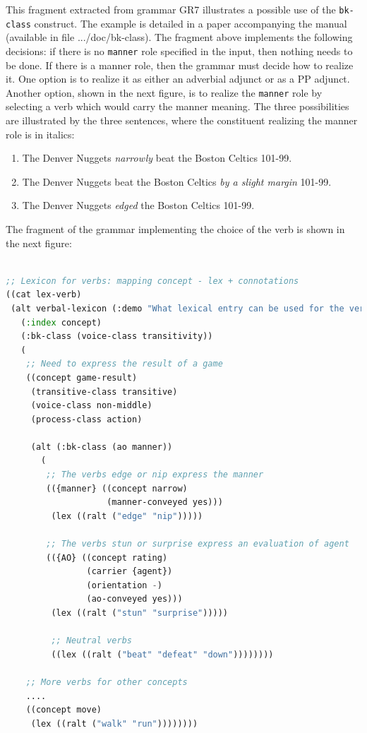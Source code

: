 \documentclass[10pt,a4paper]{report}
\begin{document}
This fragment extracted from grammar GR7  illustrates a
possible use of the {\tt bk-class} construct.  The example is detailed in a
paper accompanying the manual (available in file .../doc/bk-class).  The
fragment above implements the following decisions: if there is no
{\tt manner} role specified in the input, then nothing needs to be done.  If
there is a manner role, then the grammar must decide how to realize it.
One option is to realize it as either an adverbial adjunct or as a PP
adjunct.  Another option, shown in the next figure, is to realize the
{\tt manner} role by selecting a verb which would carry the manner meaning.
The three possibilities are illustrated by the three sentences, where the
constituent realizing the manner role is in italics:

\begin{enumerate}
\item The Denver Nuggets {\em narrowly} beat the Boston Celtics 101-99.

\item The Denver Nuggets beat the Boston Celtics {\em by a slight margin} 101-99.

\item The Denver Nuggets {\em edged} the Boston Celtics 101-99.
\end{enumerate}

The fragment of the grammar implementing the choice of the verb is shown in
the next figure:

\begin{lstlisting}[language=Lisp]

;; Lexicon for verbs: mapping concept - lex + connotations
((cat lex-verb)
 (alt verbal-lexicon (:demo "What lexical entry can be used for the verb?")
   (:index concept) 
   (:bk-class (voice-class transitivity))
   (
    ;; Need to express the result of a game
    ((concept game-result)
     (transitive-class transitive)
     (voice-class non-middle)
     (process-class action)

     (alt (:bk-class (ao manner))
       (
        ;; The verbs edge or nip express the manner
		(({manner} ((concept narrow)
					(manner-conveyed yes)))
         (lex ((ralt ("edge" "nip")))))
	      
        ;; The verbs stun or surprise express an evaluation of agent
		(({AO} ((concept rating)
				(carrier {agent})
				(orientation -)
				(ao-conveyed yes)))
         (lex ((ralt ("stun" "surprise")))))
	      
         ;; Neutral verbs
         ((lex ((ralt ("beat" "defeat" "down"))))))))
    
    ;; More verbs for other concepts
    ....
    ((concept move)
     (lex ((ralt ("walk" "run"))))))))

\end{lstlisting}
\end{document}
